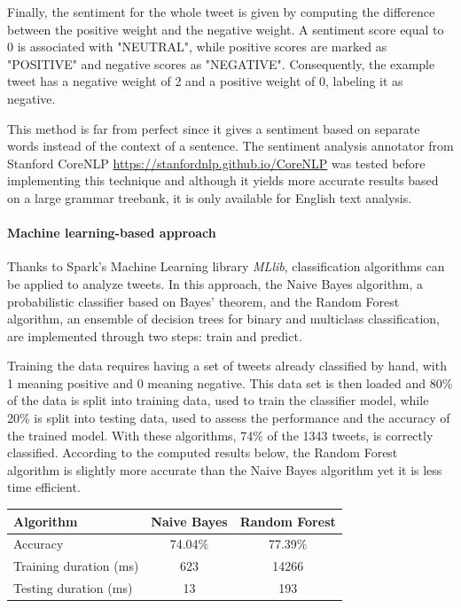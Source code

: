 \documentclass[11pt]{article}
\begin{document}
Finally, the sentiment for the whole tweet is given by computing the difference between the positive weight and the negative weight. A sentiment score equal to 0 is associated with "NEUTRAL", while positive scores are marked as "POSITIVE" and negative scores as "NEGATIVE". Consequently, the example tweet has a negative weight of 2 and a positive weight of 0, labeling it as negative.

This method is far from perfect since it gives a sentiment based on separate words instead of the context of a sentence. The sentiment analysis annotator from Stanford CoreNLP \url{https://stanfordnlp.github.io/CoreNLP} was tested before implementing this technique and although it yields more accurate results based on a large grammar treebank, it is only available for English text analysis.

\paragraph{Machine learning-based approach}

Thanks to Spark's Machine Learning library \textit{MLlib}, classification algorithms can be applied to analyze tweets. In this approach, the Naive Bayes algorithm, a probabilistic classifier based on Bayes' theorem, and the Random Forest algorithm, an ensemble of decision trees for binary and multiclass classification, are implemented through two steps: train and predict.

Training the data requires having a set of tweets already classified by hand, with 1 meaning positive and 0 meaning negative. This data set is then loaded and 80\% of the data is split into training data, used to train the classifier model, while 20\% is split into testing data, used to assess the performance and the accuracy of the trained model.
With these algorithms, 74\% of the 1343 tweets, is correctly classified. According to the computed results below, the Random Forest algorithm is slightly more accurate than the Naive Bayes algorithm yet it is less time efficient. %

\begin{center}
\begin{tabular}{|l|c|c|}
  \hline
  Algorithm & Naive Bayes & Random Forest \\
  \hline
  Accuracy & 74.04\% & 77.39\% \\
  Training duration (ms) & 623 & 14266 \\
  Testing duration (ms) & 13 & 193 \\
  \hline
\end{tabular}
\end{center}
\end{document}
